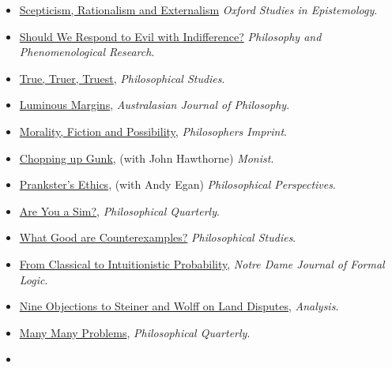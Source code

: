 \documentclass[
  10pt,
  letterpaper,
  DIV=11,
  numbers=noendperiod,
  twoside]{scrartcl}
\begin{document}
\begin{itemize}
{  We Do Without Pragmatic Encroachment?} \emph{Philosophical
  Perspectives}.
\item
  \href{https://brian.weatherson.org/quarto/posts/sre/scepticism-rationalism-and-externalism.html}{Scepticism,
  Rationalism and Externalism} \emph{Oxford Studies in Epistemology}.
\item
  \href{https://brian.weatherson.org/quarto/posts/evil/should-we-respond-to-evil-with-indifference.html}{Should
  We Respond to Evil with Indifference?} \emph{Philosophy and
  Phenomenological Research}.
\item
  \href{https://brian.weatherson.org/quarto/posts/ttt/true-truer-truest.html}{True,
  Truer, Truest}, \emph{Philosophical Studies}.
\item
  \href{https://brian.weatherson.org/quarto/posts/lummarg/luminous-margins.html}{Luminous
  Margins}, \emph{Australasian Journal of Philosophy}.
\item
  \href{https://brian.weatherson.org/quarto/posts/mfp/morality-fiction-and-possibility.html}{Morality,
  Fiction and Possibility}, \emph{Philosophers Imprint}.
\item
  \href{https://brian.weatherson.org/quarto/posts/gunk/chopping-up-gunk.html}{Chopping
  up Gunk}, (with John Hawthorne) \emph{Monist}.
\item
  \href{https://brian.weatherson.org/quarto/posts/prank/pranksters-ethics.html}{Prankster's
  Ethics}, (with Andy Egan) \emph{Philosophical Perspectives}.
\item
  \href{https://brian.weatherson.org/quarto/posts/sims/are-you-a-sim.html}{Are
  You a Sim?}, \emph{Philosophical Quarterly}.
\item
  \href{https://brian.weatherson.org/quarto/posts/wgac/what-good-are-counterexamples.html}{What
  Good are Counterexamples?} \emph{Philosophical Studies}.
\item
  \href{https://brian.weatherson.org/quarto/posts/conprob/from-classical-to-intuitionistic-probability.html}{From
  Classical to Intuitionistic Probability}, \emph{Notre Dame Journal of
  Formal Logic}.
\item
  \href{https://brian.weatherson.org/quarto/posts/nine-obj/nine-objections-to-steiner-and-wolff-on-land-disputes.html}{Nine
  Objections to Steiner and Wolff on Land Disputes}, \emph{Analysis}.
\item
  \href{https://brian.weatherson.org/quarto/posts/mmp/many-many-problems.html}{Many
  Many Problems}, \emph{Philosophical Quarterly}.
\item

\end{itemize}
\end{document}
